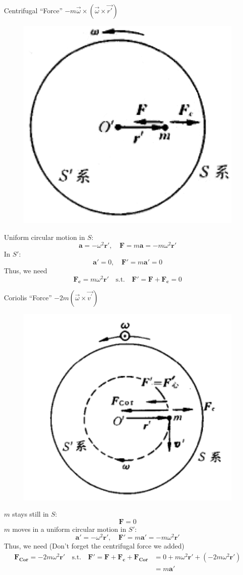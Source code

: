 \documentclass{beamer}
\begin{document}
\begin{frame}{Centrifugal ``Force'' $-m\vec{\omega}\times(\vec{\omega}\times \vec{r'})$}
  \begin{figure}[htbp]
  \centering
  \includegraphics[width=0.25 \linewidth, angle =0]{centrifugal.png}
  \label{fig:2}
  \end{figure}
  Uniform circular motion in $S:$
  $$
  \mathbf{a}=-\omega^2\mathbf{r'},\quad \mathbf{F} = m\mathbf{a}=-m\omega^2\mathbf{r'}
  $$
  In $S'$:
  $$\mathbf{a'}=0,\quad \mathbf{F'}=m\mathbf{a'}=0$$
  Thus, we need
  $$\mathbf{F_c}=m\omega^2\mathbf{r'}\quad\text{s.t.}\quad \mathbf{F'}=\mathbf{F}+\mathbf{F_c}=0$$
\end{frame}

\begin{frame}{Coriolis ``Force'' $-2 m(\vec{\omega} \times \vec{v^{\prime}})$}
  \begin{figure}[htbp]
  \centering
  \includegraphics[width=0.23 \linewidth, angle =0]{coriolis.png}
  \label{fig:3}
  \end{figure}
  $m$ stays still in $S$:
  $$\mathbf{F} = 0$$
  $m$ moves in a uniform circular motion in $S'$:
  $$\mathbf{a'}=-\omega^2\mathbf{r'},\quad \mathbf{F'}=m\mathbf{a'}=-m\omega^2\mathbf{r'}$$
  Thus, we need (Don't forget the centrifugal force we added)
  \begin{align*}
  \mathbf{F_{Cor}}=-2m\omega^2\mathbf{r'}\quad\text{s.t.}\quad \mathbf{F'}=\mathbf{F}+\mathbf{F_c}+\mathbf{F_{Cor}} & =0+m\omega^2\mathbf{r'}+(-2m\omega^2\mathbf{r'})\\ &=m\mathbf{a'} 
  \end{align*}
\end{frame}
\end{document}
